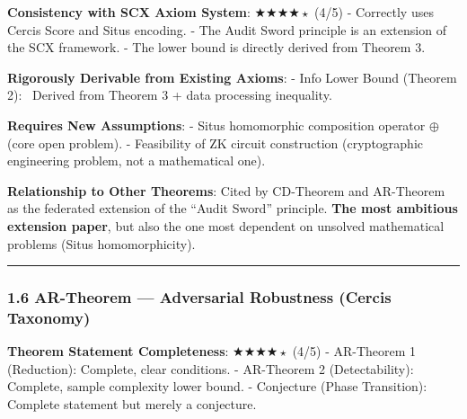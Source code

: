 \documentclass[
  12pt,
]{article}
\begin{document}
\textbf{Consistency with SCX Axiom System}: $\bigstar\bigstar\bigstar\bigstar{\scriptstyle\star}$ (4/5)
- Correctly uses Cercis Score and Situs encoding.
- The Audit Sword principle is an extension of the SCX framework.
- The lower bound is directly derived from Theorem 3.

\textbf{Rigorously Derivable from Existing Axioms}:
- Info Lower Bound (Theorem 2): \checkmark\ Derived from Theorem 3 + data processing inequality.

\textbf{Requires New Assumptions}:
- Situs homomorphic composition operator $\oplus$ (core open problem).
- Feasibility of ZK circuit construction (cryptographic engineering problem, not a mathematical one).

\textbf{Relationship to Other Theorems}: Cited by CD-Theorem and AR-Theorem as the federated extension of the ``Audit Sword'' principle. \textbf{The most ambitious extension paper}, but also the one most dependent on unsolved mathematical problems (Situs homomorphicity).

\begin{center}\rule{0.5\linewidth}{0.5pt}\end{center}

\subsubsection{1.6 AR-Theorem --- Adversarial Robustness (Cercis Taxonomy)}\label{ar-theorem-adversarial-robustness-cercis-taxonomy}

\textbf{Theorem Statement Completeness}: $\bigstar\bigstar\bigstar\bigstar{\scriptstyle\star}$ (4/5)
- AR-Theorem 1 (Reduction): Complete, clear conditions.
- AR-Theorem 2 (Detectability): Complete, sample complexity lower bound.
- Conjecture (Phase Transition): Complete statement but merely a conjecture.
\end{document}
